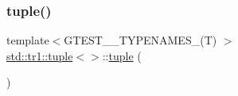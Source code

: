 \subsubsection{\texorpdfstring{tuple()}{tuple()}\hspace{0.1cm}{\footnotesize\ttfamily [1/4]}}
{\footnotesize\ttfamily template$<$G\+T\+E\+S\+T\+\_\+\_\+\+T\+Y\+P\+E\+N\+A\+M\+E\+S\+\_\+(\+T) $>$ \\
\mbox{\hyperlink{classstd_1_1tr1_1_1tuple}{std\+::tr1\+::tuple}}$<$$>$\+::\mbox{\hyperlink{classstd_1_1tr1_1_1tuple}{tuple}} (\begin{DoxyParamCaption}{ }\end{DoxyParamCaption})\hspace{0.3cm}{\ttfamily [inline]}}

\mbox{\label{classstd_1_1tr1_1_1tuple_a349b7948d183b7f05c1a5fd6aa4eaeb8}} 
